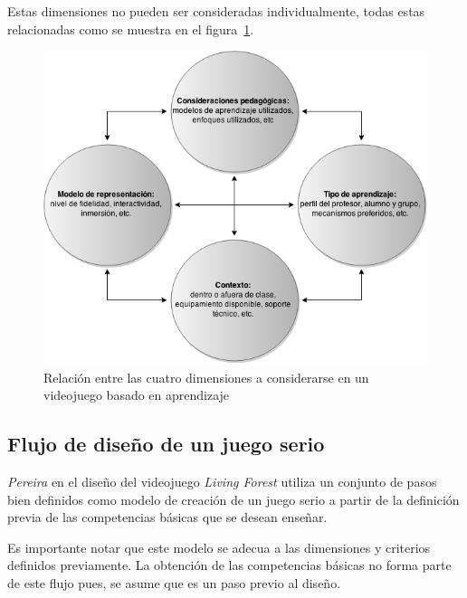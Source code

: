 Estas dimensiones no pueden ser consideradas individualmente, todas estas
relacionadas  como se muestra en el figura~\ref{fig:desarrollo_dimensiones}.

\begin{figure}[H]
\centering
\includegraphics[scale=0.5]{juegos_serios/desarrollo_dimensiones.png}
\caption{Relación entre las cuatro dimensiones a considerarse en un videojuego
    basado en aprendizaje}
\label{fig:desarrollo_dimensiones}
\end{figure}

\subsection[Flujo de diseño]{Flujo de diseño de un juego serio}

\textit{Pereira}\cite{pereira2009design} en el diseño del videojuego \emph{Living
    Forest} utiliza un conjunto de pasos bien definidos como modelo de creación
de un juego serio a partir de la definición previa de las competencias básicas
que se desean enseñar.

Es importante notar que este modelo se adecua a las dimensiones y criterios
definidos previamente. La obtención de las competencias básicas no forma parte
de este flujo pues, se asume que es un paso previo al diseño.

